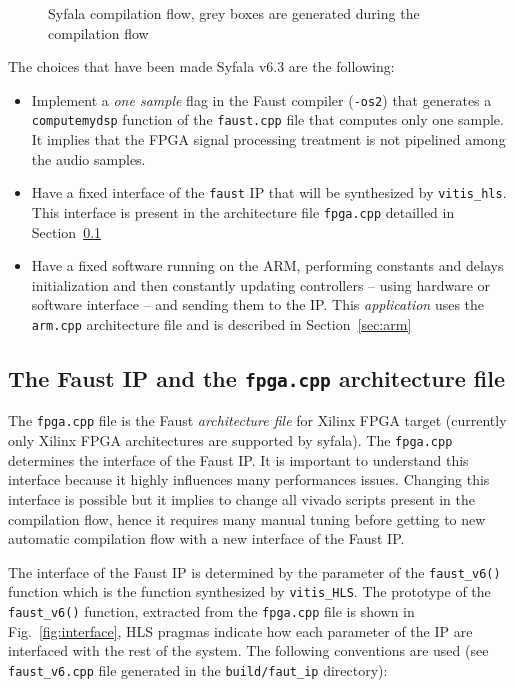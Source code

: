 \documentclass[11pt]{article}
\numberwithin{equation}{section}
\numberwithin{figure}{section}
\begin{document}
\begin{figure}[h]
  \begin{center}
    
    \end{center}
  \caption{Syfala compilation flow, grey boxes are generated during the compilation flow}
  \label{fig1}
\end{figure}

The choices that have been made Syfala v6.3 are the following:
\begin{itemize}
\item Implement a {\em one sample} flag in the Faust compiler ({\tt -os2}) that generates a {\tt computemydsp} function of the {\tt faust.cpp} file that computes only one sample. It implies that the FPGA signal processing treatment is not pipelined among the audio samples.
\item Have a fixed interface of the {\tt faust} IP that will be synthesized by {\tt vitis\_hls}.  This interface is present in the architecture file {\tt fpga.cpp} detailled in Section~\ref{sec:fpga}
\item Have a fixed software running on the ARM, performing constants and delays initialization and then constantly updating controllers -- using hardware or software interface -- and sending them to the IP. This {\em application} uses the {\tt arm.cpp} architecture file and  is described in Section~\ref{sec:arm}    
\end{itemize}
  
\subsection{The Faust IP and the {\tt fpga.cpp} architecture file}
\label{sec:fpga}
The {\tt fpga.cpp} file is the Faust {\em architecture file} for Xilinx  FPGA target  (currently only Xilinx FPGA architectures are supported by syfala). The {\tt fpga.cpp} determines the interface of the Faust IP. It is important to understand this interface because it highly influences many performances issues. Changing this interface is possible but it implies to change all vivado scripts present in the compilation flow, hence it requires many manual tuning before getting to new automatic compilation flow with a new interface of the Faust IP. 

The interface of the Faust IP is determined by the parameter of the {\tt faust\_v6()} function which is the function synthesized by {\tt vitis\_HLS}. The prototype of the {\tt faust\_v6()} function,  extracted from the {\tt fpga.cpp} file is shown in Fig.~\ref{fig:interface}, HLS pragmas indicate how each parameter of the IP are interfaced with the rest of the system. The  following conventions are used (see {\tt faust\_v6.cpp} file generated in the {\tt build/faut\_ip} directory):
\end{document}
